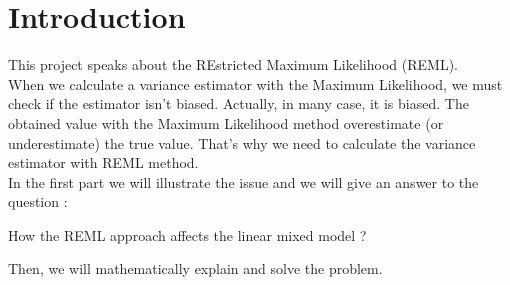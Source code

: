 \documentclass{article}
\begin{document}
\sloppy
{}


\section{Introduction}
\label{sec:introduction}
This project speaks about the REstricted Maximum Likelihood (REML).\\
When we calculate a variance estimator with the Maximum Likelihood, we must check if the estimator isn't biased. Actually, in many case, it is biased. The obtained value with the Maximum Likelihood method overestimate (or underestimate) the true value. That's why we need to calculate the variance estimator with REML method.\\
In the first part we will illustrate the issue and we will give an answer to the question :
\begin{center}
    How the REML approach affects the linear mixed model ?
\end{center}
Then, we will mathematically explain and solve the problem.


\end{document}
